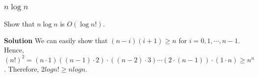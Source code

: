 \documentclass[10pt, compress]{beamer}
\begin{document}
\begin{frame}[fragile]
\frametitle{$n \log n$}
Show that $n \log n$ is $O(\log n!)$.

\textbf{Solution} We
can easily show that $(n - i)(i + 1) \ge n$ for $i = 0, 1, \cdots, n - 1$.
Hence, $(n!)^2 = (n \cdot 1)((n - 1) \cdot 2) \cdot ((n - 2) \cdot 3) \cdots (2 \cdot (n -
1)) \cdot (1 \cdot n) \ge n^n$. Therefore, $2 log n! \ge n log n$.
\end{frame}

\end{document}
